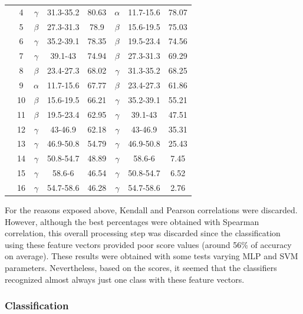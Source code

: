 \begin{table}[h!]
{\begin{tabular}{|*{8}{c|}}
		& 4     & $\gamma$ & 31.3-35.2 & 80.63 & $\alpha$ & 11.7-15.6 & 78.07 \\\cline{2-8}
		& 5     & $\beta$ & 27.3-31.3 & 78.9  & $\beta$ & 15.6-19.5 & 75.03 \\\cline{2-8}
		& 6     & $\gamma$ & 35.2-39.1 & 78.35 & $\beta$ & 19.5-23.4 & 74.56 \\\cline{2-8}
		& 7     & $\gamma$ & 39.1-43 & 74.94 & $\beta$ & 27.3-31.3 & 69.29 \\\cline{2-8}
		& 8     & $\beta$ & 23.4-27.3 & 68.02 & $\gamma$ & 31.3-35.2 & 68.25 \\\cline{2-8}
		& 9     & $\alpha$ & 11.7-15.6 & 67.77 & $\beta$ & 23.4-27.3 & 61.86 \\\cline{2-8}
		& 10    & $\beta$ & 15.6-19.5 & 66.21 & $\gamma$ & 35.2-39.1 & 55.21 \\\cline{2-8}
		& 11    & $\beta$ & 19.5-23.4 & 62.95 & $\gamma$ & 39.1-43 & 47.51 \\\cline{2-8}
		& 12    & $\gamma$ & 43-46.9 & 62.18 & $\gamma$ & 43-46.9 & 35.31 \\\cline{2-8}
		& 13    & $\gamma$ & 46.9-50.8 & 54.79 & $\gamma$ & 46.9-50.8 & 25.43 \\\cline{2-8}
		& 14    & $\gamma$ & 50.8-54.7 & 48.89 & $\gamma$ & 58.6-6 & 7.45 \\\cline{2-8}
		& 15    & $\gamma$ & 58.6-6 & 46.54 & $\gamma$ & 50.8-54.7 & 6.52 \\\cline{2-8}
		& 16    & $\gamma$ & 54.7-58.6 & 46.28 & $\gamma$ & 54.7-58.6 & 2.76 \\\hline
	\end{tabular}%
	}
	\label{Table: Correlation}%
\end{table}%

For the reasons exposed above, Kendall and Pearson correlations were discarded. However, although the best percentages were obtained with Spearman correlation, this overall processing step was discarded since the classification using these feature vectors provided poor score values (around 56\% of accuracy on average). These results were obtained with some tests varying MLP and SVM parameters. Nevertheless, based on the scores, it seemed that the classifiers recognized almost always just one class with these feature vectors.\\

\subsubsection{Classification}

